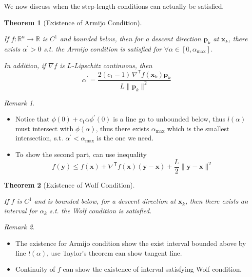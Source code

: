 \documentclass[
  letterpaper,
  DIV=11,
  numbers=noendperiod]{scrreprt}
\providecommand{\tightlist}{%
  \setlength{\itemsep}{0pt}\setlength{\parskip}{0pt}}
\theoremstyle{definition}
\theoremstyle{plain}
\newtheorem{theorem}{Theorem}[chapter]
\theoremstyle{plain}
\theoremstyle{definition}
\theoremstyle{plain}
\theoremstyle{plain}
\theoremstyle{remark}
\newtheorem{refremark}{Remark}[chapter]
\begin{document}
We now discuss when the step-length conditions can actually be
satisfied.

\begin{theorem}[Existence of Armijo
Condition]\protect\hypertarget{thm-armijo-existence}{}\label{thm-armijo-existence}

If \(f:\mathbb{R}^n\rightarrow\mathbb{R}\) is \(C^1\) and bounded below,
then for a descent direction \(\mathbf{p}_k\) at \(\mathbf{x}_k\), there
exists \(\alpha^\prime>0\) s.t. the Armijo condition is satisfied for
\(\forall\alpha\in[0, \alpha_{\max}]\).

In addition, if \(\nabla f\) is \(L\)-Lipschitz continuous, then \[
\alpha^\prime = \frac{2(c_1-1)\,\nabla^{\mathsf T}f(\mathbf{x}_k)\mathbf{p}_k}{L\|\mathbf{p}_k\|^2}
\]

\end{theorem}

\begin{refremark}
\leavevmode

\begin{itemize}
\tightlist
\item
  Notice that \(\phi(0)+c_1\alpha\phi^\prime(0)\) is a line go to
  unbounded below, thus \(l(\alpha)\) must intersect with
  \(\phi(\alpha)\), thus there exists \(\alpha_{\max}\) which is the
  smallest intersection, s.t. \(\alpha^\prime<\alpha_{\max}\) is the one
  we need.
\item
  To show the second part, can use inequality \[
  f(\mathbf{y}) \leq f(\mathbf{x}) + \nabla^{\mathsf T}f(\mathbf{x})(\mathbf{y}-\mathbf{x}) + \frac{L}{2}\|\mathbf{y}-\mathbf{x}\|^2
  \]
\end{itemize}

\label{rem-armijo-existence}

\end{refremark}

\begin{theorem}[Existence of Wolf
Condition]\protect\hypertarget{thm-wolf-existence}{}\label{thm-wolf-existence}

If \(f\) is \(C^1\) and is bounded below, for a descent direction at
\(\mathbf{x}_k\), then there exists an interval for \(\alpha_k\) s.t.
the Wolf condition is satisfied.

\end{theorem}

\begin{refremark}
\leavevmode

\begin{itemize}
\tightlist
\item
  The existence for Armijo condition show the exist interval bounded
  above by line \(l(\alpha)\), use Taylor's theorem can show tangent
  line.
\item
  Continuity of \(f\) can show the existence of interval satisfying Wolf
  condition.
\end{itemize}

\label{rem-wolf-existence}

\end{refremark}
\end{document}
